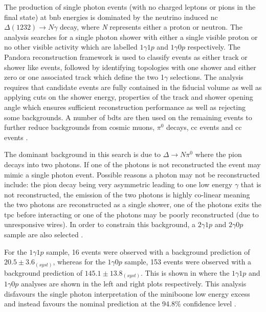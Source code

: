 The production of single photon events (with no charged leptons or pions in the final state) at \gls{bnb} energies is dominated by the neutrino induced \gls{nc} $\Delta(1232) \rightarrow N\gamma$ decay, where \textit{N} represents either a proton or neutron. The analysis searches for a single photon shower with either a single visible proton or no other visible activity which are labelled $1\gamma1p$ and $1\gamma0p$ respectively. The Pandora reconstruction framework is used to classify events as either track or shower like events, followed by identifying topologies with one shower and either zero or one associated track which define the two 1$\gamma$ selections. The analysis requires that candidate events are fully contained in the fiducial volume as well as applying cuts on the shower energy, properties of the track and shower opening angle which ensures sufficient reconstruction performance as well as rejecting some backgrounds. A number of \glspl{bdt} are then used on the remaining events to further reduce backgrounds from cosmic muons, $\pi^0$ decays, \nue \gls{cc} events and \numu \gls{cc} events \cite{Search_for_Neutrino_Induced_Neutral_Current_Delta_Radiative_Decay_in_MicroBooNE_and_a_First_Test_of_the_MiniBooNE_Low_Energy_Excess_under_a_Single_Photon_Hypothesis}. 

The dominant background in this search is due to $\Delta \rightarrow N \pi^0$ where the pion decays into two photons. If one of the photons is not reconstructed the event may mimic a single photon event. Possible reasons a photon may not be reconstructed include: the pion decay being very asymmetric leading to one low energy $\gamma$ that is not reconstructed, the emission of the two photons is highly co-linear meaning the two photons are reconstructed as a single shower, one of the photons exits the \gls{tpc} before interacting or one of the photons may be poorly reconstructed (due to unresponsive wires). In order to constrain this background, a $2\gamma1p$ and $2\gamma0p$ sample are also selected \cite{Search_for_Neutrino_Induced_Neutral_Current_Delta_Radiative_Decay_in_MicroBooNE_and_a_First_Test_of_the_MiniBooNE_Low_Energy_Excess_under_a_Single_Photon_Hypothesis}. 

For the $1\gamma1p$ sample, 16 events were observed with a background prediction of $20.5 \pm 3.6_{(syst)}$, whereas for the $1\gamma0p$ sample, 153 events were observed with a background prediction of $145.1 \pm 13.8_{(syst)}$. This is shown in  where the $1\gamma1p$ and $1\gamma0p$ analyses are shown in the left and right plots respectively. This analysis disfavours the single photon interpretation of the \gls{miniboone} low energy excess and instead favours the nominal prediction at the 94.8\% confidence level \cite{Search_for_Neutrino_Induced_Neutral_Current_Delta_Radiative_Decay_in_MicroBooNE_and_a_First_Test_of_the_MiniBooNE_Low_Energy_Excess_under_a_Single_Photon_Hypothesis}. 

